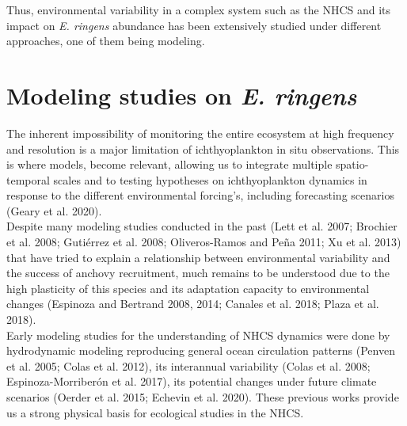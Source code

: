 Thus, environmental variability in a complex system such as the NHCS and its impact on \textit{E. ringens} abundance has been extensively studied under different approaches, one of them being modeling.\\

\section{Modeling studies on \textit{E. ringens}}

The inherent impossibility of monitoring the entire ecosystem at high frequency and resolution is a major limitation of ichthyoplankton in situ observations. This is where models, become relevant, allowing us to integrate multiple spatio-temporal scales and to testing hypotheses on ichthyoplankton dynamics in response to the different  environmental forcing’s, including forecasting scenarios \citep{GearDode2020}(Geary et al. 2020).\\

Despite many modeling studies conducted in the past \citep{LettPenv2007,BrocLett2008,GutiRami2008,OlivPena2011,XuChai2013}(Lett et al. 2007; Brochier et al. 2008; Gutiérrez et al. 2008; Oliveros-Ramos and Peña 2011; Xu et al. 2013) that have tried to explain a relationship between environmental variability and the success of anchovy recruitment, much remains to be understood due to the high plasticity of this species and its adaptation capacity to environmental changes \citep{EspiBert2008,EspiBert2014,CanaAdas2018,PlazCern2018}(Espinoza and Bertrand 2008, 2014; Canales et al. 2018; Plaza et al. 2018).\\

Early modeling studies for the understanding of NHCS dynamics were done by hydrodynamic modeling reproducing general ocean circulation patterns \citep{PenvEche2005,ColaMcwi2012}(Penven et al. 2005; Colas et al. 2012), its interannual variability \citep{ColaCape2008,EspiEche2017}(Colas et al. 2008; Espinoza-Morriberón et al. 2017), its potential changes under future climate scenarios \citep{OerdCola2015,EcheGeva2020}(Oerder et al. 2015; Echevin et al. 2020). These previous works provide us a strong physical basis for ecological studies in the NHCS.\\


